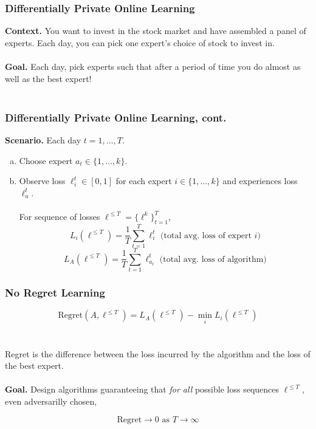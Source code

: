 \documentclass[aspectratio=169]{beamer}
\begin{document}
\begin{frame}
\frametitle{Differentially Private Online Learning}

\textbf{Context.} You want to invest in the stock market and have assembled a panel of experts. Each day, you can pick one expert's choice of stock to invest in.\\~\\

\textbf{Goal.} Each day, pick experts such that after a period of time you do almost as well as the best expert!\\~\\
\end{frame}

\begin{frame}
\frametitle{Differentially Private Online Learning, cont.}

\textbf{Scenario.} Each day $t = 1, \dots, T$.
\begin{enumerate}[(a)]
  \item Choose expert $a_t \in \{1, \dots, k\}$.
  \item Observe loss $\ell_i^t \in [0,1]$ for each expert $i \in \{1, \dots, k\}$ and experiences loss $\ell_a^t$.\\~\\

  For sequence of losses $\ell^{\leq T} = \{\ell^k\}_{t=1}^T$,
  $$L_i(\ell^{\leq T}) = \frac{1}{T} \sum_{t=1}^T \ell_i^t \text{    (total avg. loss of expert $i$)}$$
  $$L_A(\ell^{\leq T}) = \frac{1}{T} \sum_{t=1}^T \ell_{a_t}^t \text{    (total avg. loss of algorithm)}$$
\end{enumerate}
\end{frame}

\begin{frame}
\frametitle{No Regret Learning}

$$\text{Regret}(A, \ell^{\leq T}) = L_A(\ell^{\leq T}) - \min_i L_i (\ell^{\leq T})$$\\~\\

Regret is the difference between the loss incurred by the algorithm and the loss of the best expert.\\~\\

\textbf{Goal.} Design algorithms guaranteeing that \emph{for all} possible loss sequences $\ell^{\leq T}$, even adversarilly chosen,

$$\text{Regret} \rightarrow 0 \text{ as } T\rightarrow \infty$$
\end{frame}
\end{document}
